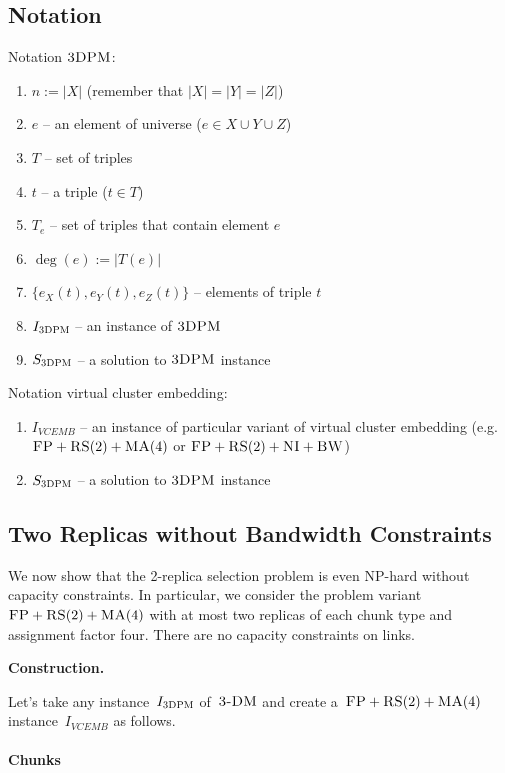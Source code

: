 \documentclass[preprint,12pt]{elsarticle}
\newcommand{\CC}{\textsc{NI}}
\newcommand{\FP}{\textsc{FP}}
\newcommand{\RS}{\textsc{RS}}
\newcommand{\BW}{\textsc{BW}}
\newcommand{\MA}{\textsc{MA}}
\newcommand{\TDPM}{\textsc{3DPM}}
\newcommand{\VCEMB}{VCEMB}
\newcommand{\TDM}{\textsc{3-DM}}
\begin{document}
\subsection{Notation}

Notation $\TDPM$:

\begin{enumerate}
  \item $n := |X|$ (remember that $|X| = |Y| = |Z|$)
  \item $e$ -- an element of universe ($e \in X \cup Y \cup Z$)
  \item $T$ -- set of triples
  \item $t$ -- a triple ($t \in T$)
  \item $T_e$ -- set of triples that contain element $e$
  \item $\deg(e) := |T(e)|$
  \item $\lbrace e_X(t), e_Y(t), e_Z(t) \rbrace$ -- elements of triple $t$
  \item $I_{\TDPM}$ -- an instance of $\TDPM$
  \item $S_{\TDPM}$ -- a solution to $\TDPM$ instance
\end{enumerate}

Notation virtual cluster embedding:

\begin{enumerate}
  \item $I_{\VCEMB}$ -- an instance of particular variant of virtual cluster embedding (e.g. $\FP+\RS(2)+\MA(4)$ or $\FP+\RS(2)+\CC+\BW$)
  \item $S_{\TDPM}$ -- a solution to $\TDPM$ instance
\end{enumerate}

\subsection{Two Replicas without Bandwidth Constraints}

We now show that the 2-replica selection problem is even NP-hard
without capacity constraints.  In particular, we consider the problem
variant~$\FP+\RS(2)+\MA(4)$ with at most two replicas of each chunk type and assignment factor
four. There are no capacity constraints on links.

\textbf{Construction.}

Let's take any instance~$I_{\TDPM}$ of~$\TDM$ and create a~$\FP+\RS(2)+\MA(4)$
instance~$I_{\VCEMB}$ as follows.

\paragraph{Chunks}
\end{document}
